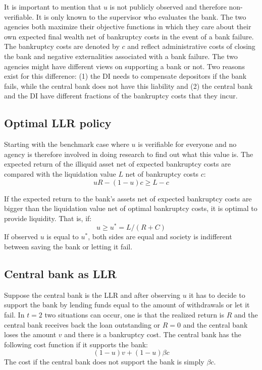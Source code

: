 \documentclass[twoside, 12pt]{article}
\numberwithin{equation}{section}
\begin{document}
It is important to mention that $u$ is not publicly observed and therefore non-verifiable. It is only known to the supervisor who evaluates the bank. The two agencies both maximize their objective functions in which they care about their own expected final wealth net of bankruptcy costs in the event of a bank failure. The bankruptcy costs are denoted by $c$ and reflect administrative costs of closing the bank and negative externalities associated with a bank failure. The two agencies might have different views on supporting a bank or not. Two reasons exist for this difference: (1) the DI needs to compensate depositors if the bank fails, while the central bank does not have this liability and (2) the central bank and the DI have different fractions of the bankruptcy costs that they incur.

\subsection{Optimal LLR policy}
Starting with the benchmark case where $u$ is verifiable for everyone and no agency is therefore involved in doing research to find out what this value is. The expected return of the illiquid asset net of expected bankruptcy costs are compared with the liquidation value $L$ net of bankruptcy costs $c$:
\begin{equation}\label{eq:a}
uR-(1-u)c \geq L-c
\end{equation}

If the expected return to the bank's assets net of expected bankruptcy costs are bigger than the liquidation value net of optimal bankruptcy costs, it is optimal to provide liquidity. That is, if:
\begin{equation}\label{optimalrepullo}
u\geq u^*= L/(R+C)
\end{equation}
If observed $u$ is equal to $u^*$, both sides are equal and society is indifferent between saving the bank or letting it fail.

\subsection{Central bank as LLR}
Suppose the central bank is the LLR and after observing $u$ it has to decide to support the bank by lending funds equal to the amount of withdrawals or let it fail. In $t=2$ two situations can occur, one is that the realized return is $R$ and the central bank receives back the loan outstanding or $R=0$ and the central bank loses the amount $v$ and there is a bankruptcy cost. The central bank has the following cost function if it supports the bank:
\begin{equation}
(1-u)v+(1-u)\beta c
\end{equation}
The cost if the central bank does not support the bank is simply $\beta c$.
\end{document}
